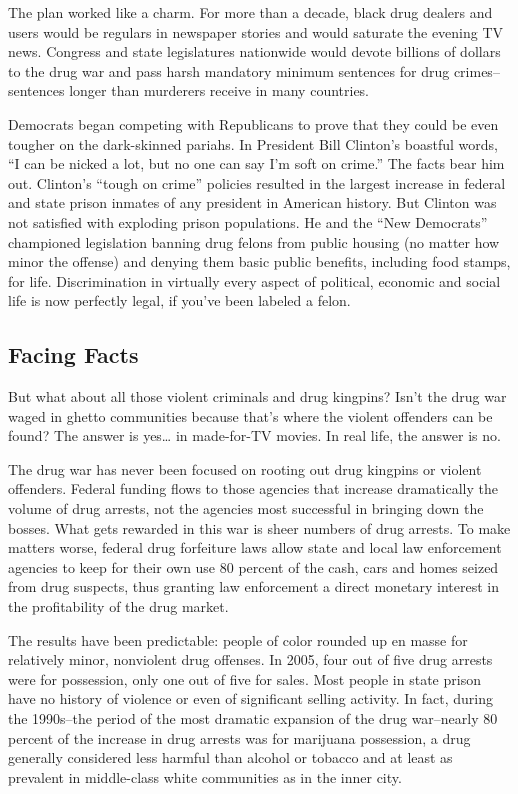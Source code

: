 \documentclass[10pt,a4paper]{article}
\begin{document}
The plan worked like a charm. For more than a decade, black drug dealers and users would be regulars in newspaper stories and would saturate the evening TV news. Congress and state legislatures nationwide would devote billions of dollars to the drug war and pass harsh mandatory minimum sentences for drug crimes–sentences longer than murderers receive in many countries.

Democrats began competing with Republicans to prove that they could be even tougher on the dark-skinned pariahs. In President Bill Clinton’s boastful words, “I can be nicked a lot, but no one can say I’m soft on crime.” The facts bear him out. Clinton’s “tough on crime” policies resulted in the largest increase in federal and state prison inmates of any president in American history. But Clinton was not satisfied with exploding prison populations. He and the “New Democrats” championed legislation banning drug felons from public housing (no matter how minor the offense) and denying them basic public benefits, including food stamps, for life. Discrimination in virtually every aspect of political, economic and social life is now perfectly legal, if you’ve been labeled a felon.

\subsection{Facing Facts}
But what about all those violent criminals and drug kingpins? Isn’t the drug war waged in ghetto communities because that’s where the violent offenders can be found? The answer is yes… in made-for-TV movies. In real life, the answer is no.

The drug war has never been focused on rooting out drug kingpins or violent offenders. Federal funding flows to those agencies that increase dramatically the volume of drug arrests, not the agencies most successful in bringing down the bosses. What gets rewarded in this war is sheer numbers of drug arrests. To make matters worse, federal drug forfeiture laws allow state and local law enforcement agencies to keep for their own use 80 percent of the cash, cars and homes seized from drug suspects, thus granting law enforcement a direct monetary interest in the profitability of the drug market.

The results have been predictable: people of color rounded up en masse for relatively minor, nonviolent drug offenses. In 2005, four out of five drug arrests were for possession, only one out of five for sales. Most people in state prison have no history of violence or even of significant selling activity. In fact, during the 1990s–the period of the most dramatic expansion of the drug war–nearly 80 percent of the increase in drug arrests was for marijuana possession, a drug generally considered less harmful than alcohol or tobacco and at least as prevalent in middle-class white communities as in the inner city.
\end{document}
